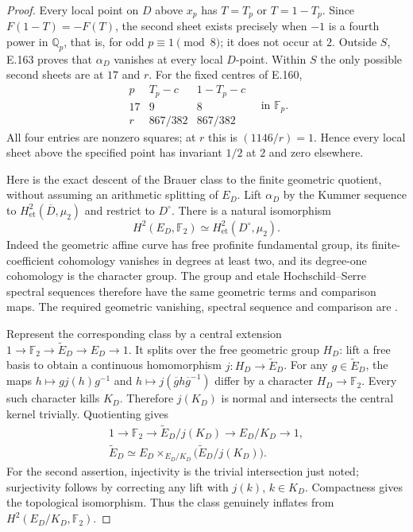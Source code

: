\begin{proof}
Every local point on $D$ above $x_p$ has
$T=T_p$ or $T=1-T_p$.  Since $F(1-T)=-F(T)$, the second
sheet exists precisely when $-1$ is a fourth power in
$\mathbb Q_p$, that is, for odd $p\equiv1\pmod8$;
it does not occur at $2$.  Outside $S$, E.163 proves that
$\alpha_D$ vanishes at every local $D$-point.  Within $S$
the only possible second sheets are at $17$ and $r$.
For the fixed centres of E.160,
\[
\begin{array}{c|cc}
 p&T_p-c&1-T_p-c\\ \hline
17&9&8\\
r&867/382&867/382
\end{array}
\quad\text{in }\mathbb F_p.
\tag{E.164.6}
\]
All four entries are nonzero squares; at $r$ this is
$(1146/r)=1$.  Hence every local sheet above the specified
point has invariant $1/2$ at $2$ and zero elsewhere.

Here is the exact descent of the Brauer class to the finite
geometric quotient, without assuming an arithmetic splitting
of $E_D$.  Lift $\alpha_D$ by the Kummer sequence to
$H^2_{\mathrm{et}}(\overline D,\mu_2)$ and restrict to $D^\circ$.
There is a natural isomorphism
\[
 H^2(E_D,\mathbb F_2)\simeq
 H^2_{\mathrm{et}}(D^\circ,\mu_2).
\tag{E.164.7}
\]
Indeed the geometric affine curve has free profinite
fundamental group, its finite-coefficient cohomology
vanishes in degrees at least two, and its degree-one
cohomology is the character group.  The group and etale
Hochschild--Serre spectral sequences therefore have the
same geometric terms and comparison maps.  The required
geometric vanishing, spectral sequence and comparison are
\citet[Theorem 14.9, Remark 14.10 and Proposition 14.12,
pp.~96--97; Theorem 21.1, p.~130]{LitMilneLEC2013}.

Represent the corresponding class by a central extension
$1\to\mathbb F_2\to\widetilde E_D\to E_D\to1$.
It splits over the free geometric group $H_D$: lift a
free basis to obtain a continuous homomorphism
$j:H_D\to\widetilde E_D$.  For any $g\in\widetilde E_D$,
the maps $h\mapsto gj(h)g^{-1}$ and
$h\mapsto j(\overline g h\overline g^{-1})$ differ by a
character $H_D\to\mathbb F_2$.  Every such character kills
$K_D$.  Therefore $j(K_D)$ is normal and intersects the
central kernel trivially.  Quotienting gives
\[
\begin{gathered}
 1\longrightarrow\mathbb F_2\longrightarrow
 \widetilde E_D/j(K_D)\longrightarrow E_D/K_D\longrightarrow1,\\
 \widetilde E_D\simeq E_D\mathbin{\times}_{E_D/K_D}
                          \bigl(\widetilde E_D/j(K_D)\bigr).
\end{gathered}
\tag{E.164.8}
\]
For the second assertion, injectivity is the trivial
intersection just noted; surjectivity follows by correcting
any lift with $j(k)$, $k\in K_D$.  Compactness gives the
topological isomorphism.  Thus the class genuinely
inflates from $H^2(E_D/K_D,\mathbb F_2)$.


\end{proof}
